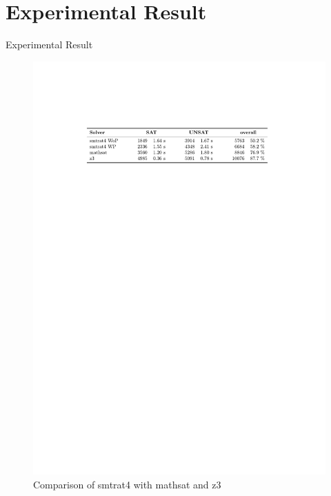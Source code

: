 \documentclass[]{beamer}
\begin{document}
\section{Experimental Result}
\begin{frame}{Experimental Result}
\begin{figure}
    \caption{Comparison of smtrat4 with mathsat and z3}
    \centering
    \includegraphics[scale=0.9]{../figures/ComparisonWithOthers.pdf}
\end{figure}
\end{frame}
\end{document}

